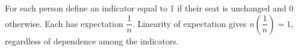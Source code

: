 For each person define an indicator equal to 1 if their seat is unchanged and 0 otherwise. Each has expectation $\dfrac{1}{n}$. Linearity of expectation gives $n(\dfrac{1}{n})=\boxed1$, regardless of dependence among the indicators.
